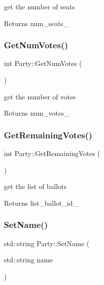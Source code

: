 get the number of seats 

\begin{DoxyReturn}{Returns}
num\+\_\+seats\+\_\+ 
\end{DoxyReturn}
\mbox{\label{classParty_ad9d2f38fc5cb90f37c5e185c57346fde}} 
\subsubsection{\texorpdfstring{Get\+Num\+Votes()}{GetNumVotes()}}
{\footnotesize\ttfamily int Party\+::\+Get\+Num\+Votes (\begin{DoxyParamCaption}{ }\end{DoxyParamCaption})}



get the number of votes 

\begin{DoxyReturn}{Returns}
num\+\_\+votes\+\_\+ 
\end{DoxyReturn}
\mbox{\label{classParty_a7f58024b3b948f2e9779f766a267c8a7}} 
\subsubsection{\texorpdfstring{Get\+Remaining\+Votes()}{GetRemainingVotes()}}
{\footnotesize\ttfamily int Party\+::\+Get\+Remaining\+Votes (\begin{DoxyParamCaption}{ }\end{DoxyParamCaption})\hspace{0.3cm}{\ttfamily [inline]}}



get the list of ballots 

\begin{DoxyReturn}{Returns}
list\+\_\+ballot\+\_\+id\+\_\+ 
\end{DoxyReturn}
\mbox{\label{classParty_a60969a52220b8358c2b85d7287a565cc}} 
\subsubsection{\texorpdfstring{Set\+Name()}{SetName()}}
{\footnotesize\ttfamily std\+::string Party\+::\+Set\+Name (\begin{DoxyParamCaption}\item[{std\+::string}]{name }\end{DoxyParamCaption})}



